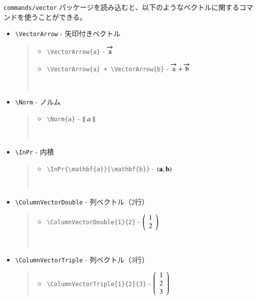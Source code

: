 \documentclass[oneside,10pt,a4paper]{jsarticle}
\begin{document}
  \verb|commands/vector| パッケージを読み込むと、以下のようなベクトルに関するコマンドを使うことができる。

  \begin{itemize}
    \item \verb|\VectorArrow| - 矢印付きベクトル
      \begin{quote}
        \Example
        \begin{itemize}
          \item \verb|\VectorArrow{a}| - $\overrightarrow{\mathstrut \mathrm{a}}$
          \item \verb|\VectorArrow{a} + \VectorArrow{b}| - $\overrightarrow{\mathstrut \mathrm{a}} + \overrightarrow{\mathstrut \mathrm{b}}$
        \end{itemize}
        \,
      \end{quote}
    \item \verb|\Norm| - ノルム
      \begin{quote}
        \Example
        \begin{itemize}
          \item \verb|\Norm{a}| - $\parallel a \parallel$
        \end{itemize}
        \,
      \end{quote}
    \item \verb|\InPr| - 内積
      \begin{quote}
        \Example
        \begin{itemize}
          \item \verb|\InPr{\mathbf{a}}{\mathbf{b}}| - $\left( \mathbf{a}, \mathbf{b} \right)$
        \end{itemize}
        \,
      \end{quote}
    \item \verb|\ColumnVectorDouble| - 列ベクトル（2行）
      \begin{quote}
        \Example
        \begin{itemize}
          \item \verb|\ColumnVectorDouble{1}{2}| - $\left( \begin{array}{c} 1 \\ 2 \end{array} \right)$
        \end{itemize}
        \,
      \end{quote}
    \item \verb|\ColumnVectorTriple| - 列ベクトル（3行）
      \begin{quote}
        \Example
        \begin{itemize}
          \item \verb|\ColumnVectorTriple{1}{2}{3}| - $\left( \begin{array}{c} 1 \\ 2 \\ 3 \end{array} \right)$
        \end{itemize}

\end{quote}
\end{itemize}
\end{document}
